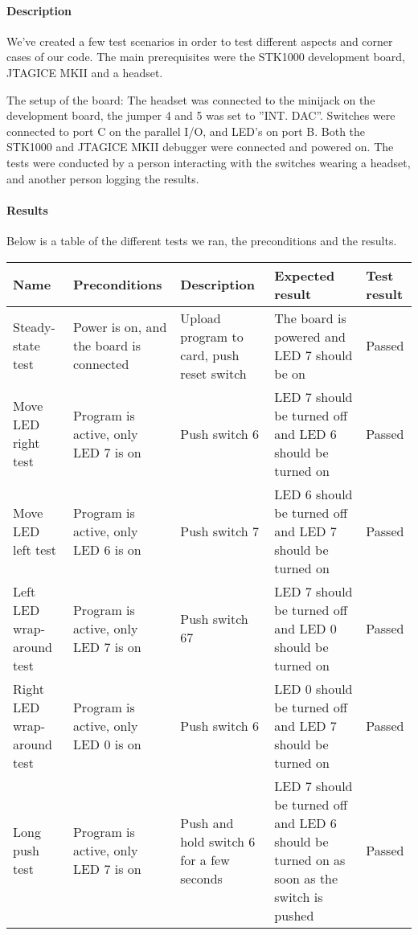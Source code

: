 \documentclass[a4paper,11pt]{article}
\begin{document}
\paragraph{Description}
We've created a few test scenarios in order to test different aspects and corner cases of our code. The main prerequisites were the STK1000 development board, JTAGICE MKII and a headset.

The setup of the board: 
The headset was connected to the minijack on the development board, the jumper 4 and 5 was set to ''INT. DAC''.
Switches were connected to port C on the parallel I/O, and LED's on port B. 
Both the STK1000 and JTAGICE MKII debugger were connected and powered on. The tests were conducted by a person interacting with the switches wearing a headset, and another person logging the results.


\paragraph{Results}
Below is a table of the different tests we ran, the preconditions and the results.
\linebreak

\renewcommand{\arraystretch}{1.25} %
\begin{tabular}[pos]{|m{70pt}|m{90pt}|m{90pt}|m{100pt}|m{60pt}|}
\hline
\textbf{Name} 				& \textbf{Preconditions}				& \textbf{Description} 					& \textbf{Expected result} 													& \textbf{Test result} 		\\ \hline

Steady-state test			& Power is on, and the board is connected & Upload program to card, push reset switch 	& The board is powered and LED 7 should be on 									& Passed 				\\ \hline

Move LED right test			& Program is active, only LED 7 is on 		& Push switch 6						 	& LED 7 should be turned off and LED 6 should be turned on 							& Passed 				\\ \hline

Move LED left test			& Program is active, only LED 6 is on 		& Push switch 7						 	& LED 6 should be turned off and LED 7 should be turned on 							& Passed 				\\ \hline

Left LED wrap-around test		& Program is active, only LED 7 is on 		& Push switch 67					 	& LED 7 should be turned off and LED 0 should be turned on 							& Passed 				\\ \hline

Right LED wrap-around test	& Program is active, only LED 0 is on 		& Push switch 6						 	& LED 0 should be turned off and LED 7 should be turned on 							& Passed 				\\ \hline

Long push test				& Program is active, only LED 7 is on 		& Push and hold switch 6 for a few seconds 	& LED 7 should be turned off and LED 6 should be turned on as soon as the switch is pushed 	& Passed 				\\ \hline
\end{tabular}
\end{document}
